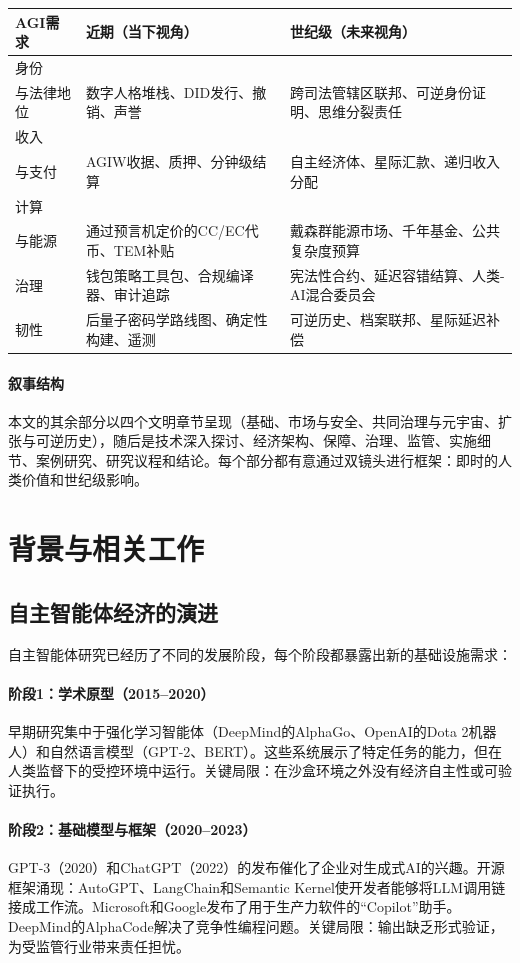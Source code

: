 \documentclass[11pt]{article}
\begin{document}
\begin{longtable}{@{}p{}p{}p{}@{}}
\toprule
\textbf{AGI需求} & \textbf{近期（当下视角）} & \textbf{世纪级（未来视角）} \\\midrule
身份 \\ 与法律地位 & 数字人格堆栈、DID发行、撤销、声誉 & 跨司法管辖区联邦、可逆身份证明、思维分裂责任 \\
收入 \\ 与支付 & AGIW收据、质押、分钟级结算 & 自主经济体、星际汇款、递归收入分配 \\
计算 \\ 与能源 & 通过预言机定价的CC/EC代币、TEM补贴 & 戴森群能源市场、千年基金、公共复杂度预算 \\
治理 & 钱包策略工具包、合规编译器、审计追踪 & 宪法性合约、延迟容错结算、人类-AI混合委员会 \\
韧性 & 后量子密码学路线图、确定性构建、遥测 & 可逆历史、档案联邦、星际延迟补偿 \\\bottomrule
\end{longtable}

\paragraph{叙事结构} 本文的其余部分以四个文明章节呈现（基础、市场与安全、共同治理与元宇宙、扩张与可逆历史），随后是技术深入探讨、经济架构、保障、治理、监管、实施细节、案例研究、研究议程和结论。每个部分都有意通过双镜头进行框架：即时的人类价值和世纪级影响。

\section{背景与相关工作}
\subsection{自主智能体经济的演进}
自主智能体研究已经历了不同的发展阶段，每个阶段都暴露出新的基础设施需求：

\paragraph{阶段1：学术原型（2015--2020）} 早期研究集中于强化学习智能体（DeepMind的AlphaGo、OpenAI的Dota 2机器人）和自然语言模型（GPT-2、BERT）。这些系统展示了特定任务的能力，但在人类监督下的受控环境中运行。关键局限：在沙盒环境之外没有经济自主性或可验证执行。

\paragraph{阶段2：基础模型与框架（2020--2023）} GPT-3（2020）和ChatGPT（2022）的发布催化了企业对生成式AI的兴趣。开源框架涌现：AutoGPT、LangChain和Semantic Kernel使开发者能够将LLM调用链接成工作流。Microsoft和Google发布了用于生产力软件的``Copilot''助手。DeepMind的AlphaCode解决了竞争性编程问题。关键局限：输出缺乏形式验证，为受监管行业带来责任担忧。
\end{document}
